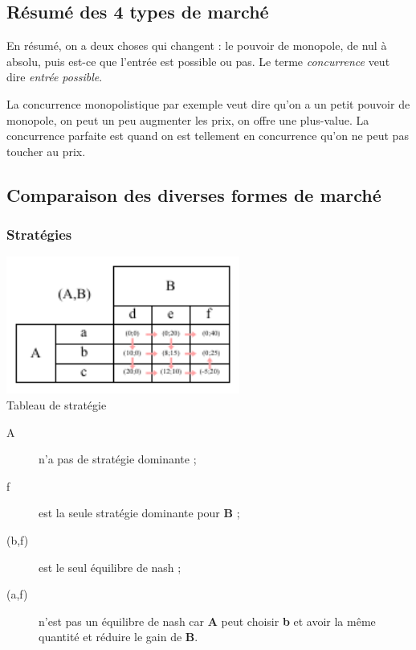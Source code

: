 \subsection{Résumé des 4 types de marché}
En résumé, on a deux choses qui changent : le pouvoir de monopole, de nul à absolu, puis est-ce que l'entrée est possible ou pas. Le terme \textit{concurrence} veut dire \textit{entrée possible}.

La concurrence monopolistique par exemple veut dire qu'on a un petit pouvoir de monopole, on peut un peu augmenter
les prix, on offre une plus-value. La concurrence parfaite est quand on est tellement en concurrence qu'on ne peut pas toucher au prix.






\subsection{Comparaison des diverses formes de marché}



\subsubsection{Stratégies}


\begin{center}
	\includegraphics[height=4.5cm]{images/strategie.pdf}\\
	Tableau de stratégie
\end{center}
\begin{description}
	\item [A] n'a pas de stratégie dominante ;
	\item [f] est la seule stratégie dominante pour \textbf{B} ;
	\item [(b,f)] est le seul équilibre de nash ;
	\item [(a,f)] n'est pas un équilibre de nash car \textbf{A} peut choisir \textbf{b} et avoir la même quantité et réduire le gain de \textbf{B}.
\end{description}
